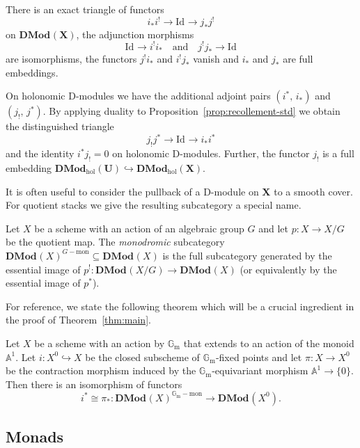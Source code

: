 \documentclass[english]{ck-article}
\newcommand\cat{\mathbf}
\newcommand\catDMod[2][]{\cat{DMod}_{#1}(#2)}
\newcommand\catDModHol[1]{\catDMod[\mathrm{hol}]{#1}}
\newcommand\catDModMon[2]{\catDMod{#1}^{#2-\mathrm{mon}}}
\newcommand\id[1][]{{\mathrm{Id}_{#1}}}
\let\stack\mathbf
\newcommand\as[2][]{\mathbb A^{#2}_{#1}}
\newcommand\Gm{\mathbb{G}_{\mathrm{m}}}
\newcommand\ΓdR{Γ_{\mkern-4mu\dR}}
\newcommand\Γsub[1]{\Gamma_{\mkern-3mu#1}}
\begin{document}
\begin{Prop}
    \label{prop:recollement-std}%
    There is an exact triangle of functors
    \[
        i_*i^! → \id → j_*j^!
    \]
    on $\catDMod{\stack X}$, the adjunction morphisms
    \[
        \id → i^!i_*
        \quad\text{and}\quad
        j^!j_* → \id
    \]
    are isomorphisms, the functors $j^!i_*$ and $i^!j_*$ vanish and $i_*$ and $j_*$ are full embeddings.
\end{Prop}

On holonomic D-modules we have the additional adjoint pairs $(i^*,\, i_*)$ and $(j_!,\, j^*)$.
By applying duality to Proposition~\ref{prop:recollement-std} we obtain the distinguished triangle
\[
    j_! j^* → \id → i_*i^*
\]
and the identity $i^*j_! = 0$ on holonomic D-modules.
Further, the functor $j_!$ is a full embedding $\catDModHol{\stack U} \hookrightarrow \catDModHol{\stack X}$.

It is often useful to consider the pullback of a D-module on $\stack X$ to a smooth cover.
For quotient stacks we give the resulting subcategory a special name.

\begin{Def}
    \label{def:pre:monodromic}%
    Let $X$ be a scheme with an action of an algebraic group $G$ and let $p\colon X → X/G$ be the quotient map.
    The \emph{monodromic} subcategory $\catDModMon{X}{G} ⊆ \catDMod{X}$ is the full subcategory generated by the essential image of $p^!\colon \catDMod{X/G} → \catDMod{X}$ (or equivalently by the essential image of $p^*$).
\end{Def}

For reference, we state the following theorem which will be a crucial ingredient in the proof of Theorem~\ref{thm:main}.

\begin{Thm}
    \label{thm:pre:contraction_principle}%
    Let $X$ be a scheme with an action by $\Gm$ that extends to an action of the monoid $\as 1$.
    Let $i\colon X^0 \hookrightarrow X$ be the closed subscheme of $\Gm$-fixed points and let $π\colon X → X^0$ be the contraction morphism induced by the $\Gm$-equivariant morphism $\as 1 → \{0\}$.
    Then there is an isomorphism of functors
    \[
        i^* \cong π_* \colon \catDModMon{X}{\Gm} → \catDMod{X^0}.
    \]
\end{Thm}


\subsection{Monads}
\label{sec:pre:monads}
\end{document}
